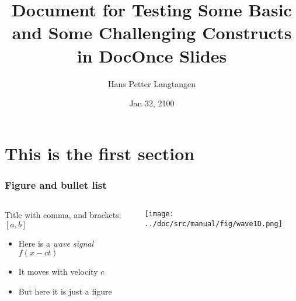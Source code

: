 \documentclass{beamer}
\begin{document}
\newcommand{\exercisesection}[1]{\subsection*{#1}}



\title{Document for Testing Some Basic and Some Challenging Constructs in DocOnce Slides}
\author{Hans Petter Langtangen}
\date{Jan 32, 2100
}

\begin{frame}
\titlepage
\end{frame}

\section[First]{This is the first section}

\begin{frame}
\frametitle{Figure and bullet list}

\begin{columns}
\pause
\begin{block}{Title with comma, and brackets: $[a,b]$ }
\footnotesize
\begin{itemize}
  \item Here is a \emph{wave signal} $f(x-ct)$
  \item It moves with velocity $c$
  \item But here it is just a figure
\end{itemize}
\noindent
\end{block}

\begin{block}{}
\vspace{6mm}
\centerline{\texttt{[image: ../doc/src/manual/fig/wave1D.png]}}
\vspace{6mm}
\end{block}

\end{columns}
\end{frame}
\end{document}
